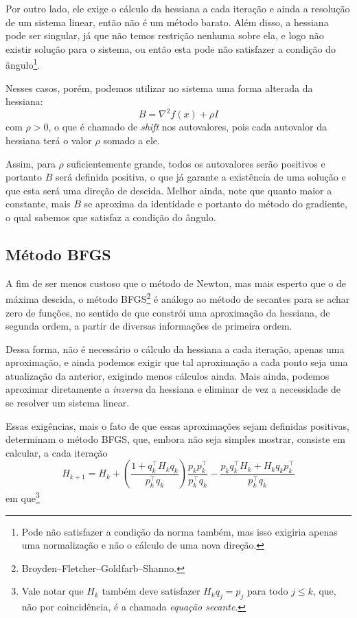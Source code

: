 \documentclass[a4paper,11pt]{article}
\begin{document}
            Por outro lado, ele exige o cálculo da hessiana a cada iteração e ainda a resolução de um sistema linear, então não é um método barato.
            Além disso, a hessiana pode ser singular, já que não temos restrição nenhuma sobre ela, e logo não existir solução para o sistema,
            ou então esta pode não satisfazer a condição do ângulo\footnote{Pode não satisfazer a condição da norma também, mas isso exigiria apenas uma normalização e não o cálculo de uma nova direção.}.

            Nesses casos, porém, podemos utilizar no sistema uma forma alterada da hessiana:
                $$ B = \nabla^2 f(x) + \rho I $$
            com $\rho > 0$, o que é chamado de \emph{shift} nos autovalores, pois cada autovalor da hessiana terá o valor $\rho$ somado a ele.

            Assim, para $\rho$ suficientemente grande, todos os autovalores serão positivos e portanto $B$ será definida positiva, o que já garante
            a existência de uma solução e que esta será uma direção de descida. Melhor ainda, note que quanto maior a constante, mais $B$ se aproxima
            da identidade e portanto do método do gradiente, o qual sabemos que satisfaz a condição do ângulo.

        \subsection*{Método BFGS}
            A fim de ser menos custoso que o método de Newton, mas mais esperto que o de máxima descida, o método BFGS\footnote{Broyden–Fletcher–Goldfarb–Shanno.}
            é análogo ao método de secantes para se achar zero de funções, no sentido de que constrói uma aproximação da hessiana, de segunda ordem, a partir
            de diversas informações de primeira ordem.

            Dessa forma, não é necessário o cálculo da hessiana a cada iteração, apenas uma aproximação, e ainda podemos exigir que tal aproximação
            a cada ponto seja uma atualização da anterior, exigindo menos cálculos ainda. Mais ainda, podemos aproximar diretamente a \emph{inversa}
            da hessiana e eliminar de vez a necessidade de se resolver um sistema linear.

            Essas exigências, mais o fato de que essas aproximações sejam definidas positivas, determinam o método BFGS, que, embora não seja
            simples mostrar, consiste em calcular, a cada iteração
                $$ H_{k+1} = H_k + \left( \frac{1 + q_k^\top H_kq_k}{p_k^\top q_k}\right)\frac{p_kp_k^\top}{p_k^\top q_k} - \frac{p_kq_k^\top H_k + H_kq_kp_k^\top}{p_k^\top q_k}$$
            em que\footnote{Vale notar que $H_k$ também deve satisfazer $H_kq_j = p_j$ para todo $j \leq k$, que, não por coincidência, é a chamada \emph{equação secante}.}
\end{document}
